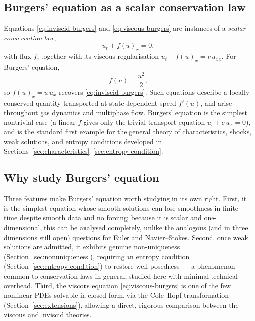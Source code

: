 \subsection{Burgers' equation as a scalar conservation law}
\label{subsec:conservation-law-framework}

Equations \eqref{eq:inviscid-burgers} and \eqref{eq:viscous-burgers} are
instances of a \emph{scalar conservation law},
\begin{equation}
  \label{eq:general-conservation-law}
  u_t + f(u)_x = 0,
\end{equation}
with flux $f$, together with its viscous regularisation $u_t + f(u)_x =
\nu\, u_{xx}$. For Burgers' equation,
\begin{equation}
  \label{eq:burgers-flux}
  f(u) = \frac{u^2}{2},
\end{equation}
so $f(u)_x = u\,u_x$ recovers \eqref{eq:inviscid-burgers}. Such equations
describe a locally conserved quantity transported at state-dependent
speed $f'(u)$, and arise throughout gas dynamics and multiphase flow.
Burgers' equation is the simplest nontrivial case (a linear $f$
gives only the trivial transport equation $u_t + c\,u_x=0$), and is the
standard first example for the general theory of characteristics, shocks,
weak solutions, and entropy conditions developed in
Sections~\ref{sec:characteristics}--\ref{sec:entropy-condition}.

\subsection{Why study Burgers' equation}
\label{subsec:significance}

Three features make Burgers' equation worth studying in its own right.
First, it is the simplest equation whose smooth solutions can lose
smoothness in finite time despite smooth data and no forcing; because it
is scalar and one-dimensional, this can be analysed completely, unlike
the analogous (and in three dimensions still open) questions for Euler
and Navier--Stokes. Second, once weak solutions are admitted, it exhibits
genuine non-uniqueness (Section~\ref{sec:nonuniqueness}), requiring an
entropy condition (Section~\ref{sec:entropy-condition}) to restore
well-posedness --- a phenomenon common to conservation laws in general,
studied here with minimal technical overhead. Third, the viscous equation
\eqref{eq:viscous-burgers} is one of the few nonlinear PDEs solvable in
closed form, via the Cole--Hopf transformation
(Section~\ref{sec:extensions}), allowing a direct, rigorous comparison
between the viscous and inviscid theories.